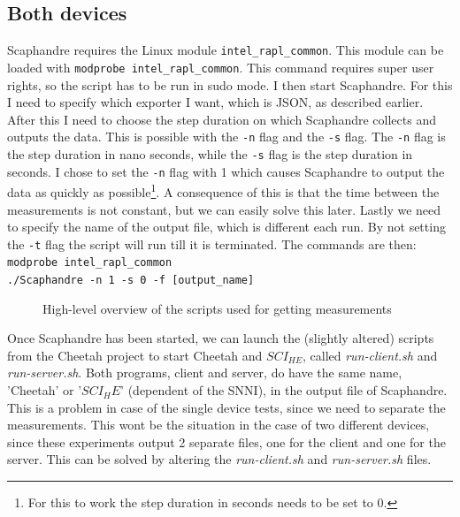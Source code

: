 \documentclass[../thesis.tex]{subfiles}
\begin{document}
\subsection{Both devices}
Scaphandre requires the Linux module \verb|intel_rapl_common|. This module can be loaded with \verb|modprobe intel_rapl_common|. This command requires super user rights, so the script has to be run in sudo mode. I then start Scaphandre. For this I need to specify which exporter I want, which is JSON, as described earlier. After this I need to choose the step duration on which Scaphandre collects and outputs the data. This is possible with the \verb|-n| flag and the \verb|-s| flag. The \verb|-n| flag is the step duration in nano seconds, while the \verb|-s| flag is the step duration in seconds. I chose to set the \verb|-n| flag with 1 which causes Scaphandre to output the data as quickly as possible\footnote{For this to work the step duration in seconds needs to be set to 0.}. A consequence of this is that the time between the measurements is not constant, but we can easily solve this later. Lastly we need to specify the name of the output file, which is different each run. By not setting the \verb|-t| flag the script will run till it is terminated. The commands are then:\\

\noindent\verb|modprobe intel_rapl_common|\\
\verb|./Scaphandre -n 1 -s 0 -f [output_name]|\\

\begin{figure}
    \centering
       
    \caption{High-level overview of the scripts used for getting measurements}
    \label{fig:scripts}
\end{figure}

Once Scaphandre has been started, we can launch the (slightly altered) scripts from the Cheetah project to start Cheetah and $SCI_{HE}$, called \textit{run-client.sh} and \textit{run-server.sh}. Both programs, client and server, do have the same name, 'Cheetah' or '$SCI_HE$' (dependent of the SNNI), in the output file of Scaphandre. This is a problem in case of the single device tests, since we need to separate the measurements. This wont be the situation in the case of two different devices, since these experiments output 2 separate files, one for the client and one for the server. This can be solved by altering the \textit{run-client.sh} and \textit{run-server.sh} files.
\end{document}
